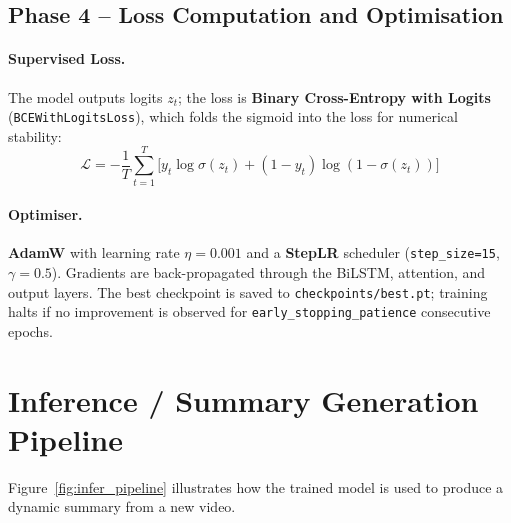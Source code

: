 \documentclass[12pt, a4paper]{report}
\begin{document}
\subsection{Phase 4 -- Loss Computation and Optimisation}

\paragraph{Supervised Loss.}
The model outputs logits $z_t$; the loss is \textbf{Binary Cross-Entropy with Logits}
(\texttt{BCEWithLogitsLoss}), which folds the sigmoid into the loss for numerical stability:
\begin{equation}
  \mathcal{L} = -\frac{1}{T}\sum_{t=1}^{T}
    \bigl[y_t \log\sigma(z_t) + (1-y_t)\log(1-\sigma(z_t))\bigr]
\end{equation}

\paragraph{Optimiser.}
\textbf{AdamW} with learning rate $\eta = 0.001$ and a \textbf{StepLR} scheduler
(\texttt{step\_size=15}, $\gamma=0.5$). Gradients are back-propagated through the
BiLSTM, attention, and output layers. The best checkpoint is saved to
\texttt{checkpoints/best.pt}; training halts if no improvement is observed for
\texttt{early\_stopping\_patience} consecutive epochs.

\section{Inference / Summary Generation Pipeline}

Figure~\ref{fig:infer_pipeline} illustrates how the trained model is used to produce
a dynamic summary from a new video.
\end{document}
